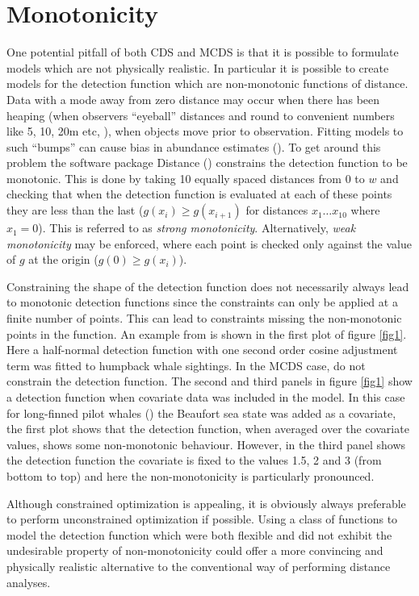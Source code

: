 \section{Monotonicity}
\label{intro-ds-mono}
One potential pitfall of both CDS and MCDS is that  it is possible to formulate models which are not physically realistic. In particular it is possible to create models for the detection function which are non-monotonic functions of distance. Data with a mode away from zero distance may occur when there has been heaping (when observers ``eyeball'' distances and round to convenient numbers like 5, 10, 20m etc, \cite[pp. 34-35]{IDS}), when objects move prior to observation. Fitting models to such ``bumps'' can cause bias in abundance estimates (\cite[p. 132]{IDS}). To get around this problem the software package Distance (\cite{distance-software})\label{cor-7s14-2} constrains the detection function to be monotonic. This is done by taking 10 equally spaced distances from $0$ to $w$ and checking that when the detection function is evaluated at each of these points they are less than the last ($g(x_i)\geq g(x_{i+1})$ for distances $x_1 \dots x_{10}$ where $x_1=0$). This is referred to as \textit{strong monotonicity}. Alternatively, \textit{weak monotonicity} may be enforced, where each point is checked only against the value of $g$ at the origin ($g(0)\geq g(x_i)$).

Constraining the shape of the detection function does not necessarily always lead to monotonic detection functions since the constraints can only be applied at a finite number of points. This can lead to constraints missing the non-monotonic points in the function. An example from  is shown in the first plot of figure \ref{fig1}. Here a half-normal detection function with one second order cosine adjustment term was fitted to humpback whale sightings. In the MCDS case,  do not constrain the detection function. The second and third panels in figure \ref{fig1} show a detection function when covariate data was included in the model. In this case for long-finned pilot whales (\cite{pike}) the Beaufort sea state was added as a covariate, the first plot shows that the detection function, when averaged over the covariate values, shows some non-monotonic behaviour. However, in the third panel shows the detection function the covariate is fixed to the values 1.5, 2 and 3 (from bottom to top) and here the non-monotonicity is particularly pronounced. 

Although constrained optimization is appealing, it is obviously always preferable to perform unconstrained optimization if possible. Using a class of functions to model the detection function which were both flexible and did not exhibit the undesirable property of non-monotonicity could offer a more  convincing and physically realistic alternative to the conventional way of performing distance analyses.

